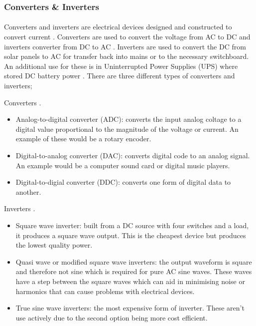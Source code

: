 \subsubsection{Converters \& Inverters}

\paragraph{}
Converters and inverters are electrical devices designed and constructed to convert current \cite{Krishna2016}. Converters are used to convert the voltage from AC to DC and inverters converter from DC to AC \cite{Krishna2016}. Inverters are used to convert the DC from solar panels to AC for transfer back into mains or to the necessary switchboard. An additional use for these is in Uninterrupted Power Supplies (UPS) where stored DC battery power \cite{Krishna2016}. There are three different types of converters and inverters;  

Converters \cite{website:ConvVsInverter}.  
\begin{itemize}
\itemsep-0.5em 
\item Analog-to-digital converter (ADC): converts the input analog coltage to a digital value proportional to the magnitude of the voltage or current. An example of these would be a rotary encoder. 
\item Digital-to-analog converter (DAC): converts digital code to an analog signal. An example would be a computer sound card or digital music players.
\item Digital-to-digial converter (DDC): converts one form of digital data to another.
\end{itemize} 

Inverters \cite{website:ConvVsInverter}.  
\begin{itemize}
\itemsep-0.5em 
\item Square wave inverter: built from a DC source with four switches and a load, it produces a square wave output. This is the cheapest device but produces the lowest quality power. 
\item Quasi wave or modified square wave inverters: the output waveform is square and therefore not sine which is required for pure AC sine waves. These waves have a step between the square waves which can aid in minimising noise or harmonics that can cause problems with electrical devices. 
\item True sine wave inverters: the most expensive form of inverter. These aren't use actively due to the second option being more cost efficient.  
\end{itemize}   

